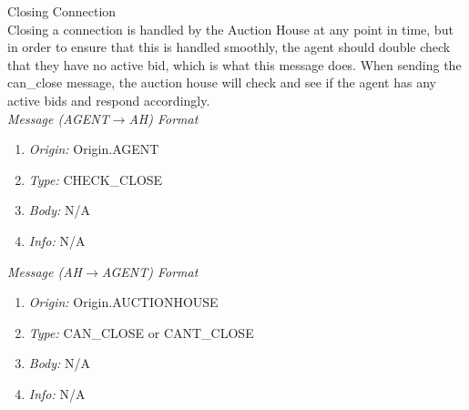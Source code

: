 \documentclass{article}
\begin{document}
\vspace{1cm}
\normalsize
\large
Closing Connection 
\normalsize
\\Closing a connection is handled by the Auction House at any point in time, but in order to ensure that this is handled smoothly, the agent should double check that they have no active bid, which is what this message does. When sending the can\_close message, the auction house will check and see if the agent has any active bids and respond accordingly. 
\footnotesize
\\\emph{Message (AGENT$\to$AH) Format} 
\begin{enumerate} 
	\item[]\emph{Origin:} Origin.AGENT 
	\item[]\emph{Type:} CHECK\_CLOSE
	\item[]\emph{Body:} N/A 
	\item[]\emph{Info:} N/A 
\end{enumerate} 
\emph{Message (AH$\to$AGENT) Format} 
\begin{enumerate} 
	\item[]\emph{Origin:} Origin.AUCTIONHOUSE
	\item[]\emph{Type:} CAN\_CLOSE or CANT\_CLOSE 
	\item[]\emph{Body:} N/A
	\item[]\emph{Info:} N/A 
\end{enumerate}
\end{document}
